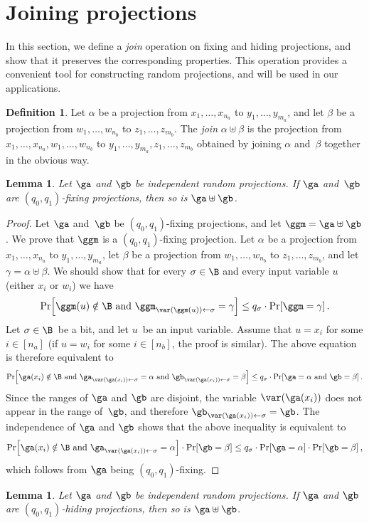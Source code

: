\documentclass[11pt]{article}
\numberwithin{equation}{section}
\newtheorem{lemma}[theorem]{Lemma}
\theoremstyle{definition}
\newtheorem{definition}[theorem]{Definition}
\theoremstyle{plain}
\theoremstyle{definition}\newtheorem{notation}[theorem]{Notation}\theoremstyle{plain}
\begin{document}
\section{\label{sec:join}Joining projections}

In this section, we define a \emph{join} operation on fixing and hiding
projections, and show that it preserves the corresponding properties.
This operation provides a convenient tool for constructing random
projections, and will be used in our applications.
\begin{definition}
Let $\alpha$ be a projection from $x_{1},\ldots,x_{n_{a}}$ to $y_{1},\ldots,y_{m_{a}}$,
and let $\beta$ be a projection from $w_{1},\ldots,w_{n_{b}}$ to
$z_{1},\ldots,z_{m_{b}}$. The \emph{join} $\alpha\uplus\beta$ is
the projection from $x_{1},\ldots,x_{n_{a}},w_{1},\ldots,w_{n_{b}}$
to $y_{1},\ldots,y_{m_{a}},z_{1},\ldots,z_{m_{b}}$ obtained by joining
$\alpha$ and~$\beta$ together in the obvious way. 
\end{definition}

\begin{lemma}
\label{lemma:concat-fixing}Let $\ga$ and $\gb$ be independent random
projections. If $\ga$ and~$\gb$ are $(q_{0},q_{1})$-fixing projections,
then so is $\ga\uplus\gb$. 
\end{lemma}

\begin{proof}
Let $\ga$ and~$\gb$ be $(q_{0},q_{1})$-fixing projections, and
let $\ggm=\ga\uplus\gb$. We prove that $\ggm$ is a $(q_{0},q_{1})$-fixing
projection. Let $\alpha$ be a projection from $x_{1},\ldots,x_{n_{a}}$
to $y_{1},\ldots,y_{m_{a}}$, let $\beta$ be a projection from $w_{1},\ldots,w_{n_{b}}$
to $z_{1},\ldots,z_{m_{b}}$, and let $\gamma=\alpha\uplus\beta$.
We should show that for every $\sigma\in\B$ and every input variable
$u$ (either $x_{i}$ or $w_{i}$) we have 
\[
\Pr\!\left[\ggm(u)\notin\B\text{ and }\ggm_{\var(\ggm(u))\gets\sigma}=\gamma\right]\leq q_{\sigma}\cdot\Pr\!\left[\ggm=\gamma\right].
\]
Let $\sigma\in\B$~be a bit, and let $u$~be an input variable.
Assume that $u=x_{i}$ for some $i\in\left[n_{a}\right]$ (if $u=w_{i}$
for some $i\in\left[n_{b}\right]$, the proof is similar). The above
equation is therefore equivalent to 
\[
\Pr\!\left[\ga(x_{i})\notin\B\text{ and }\ga_{\var(\ga(x_{i}))\gets\sigma}=\alpha\text{ and }\gb_{\var(\ga(x_{i}))\gets\sigma}=\beta\right]\leq q_{\sigma}\cdot\Pr\!\left[\ga=\alpha\text{ and }\gb=\beta\right].
\]
Since the ranges of $\ga$ and $\gb$ are disjoint, the variable $\var(\ga(x_{i}))$
does not appear in the range of~$\gb$, and therefore $\gb_{\var(\ga(x_{i}))\gets\sigma}=\gb$.
The independence of $\ga$ and $\gb$ shows that the above inequality
is equivalent to 
\[
\Pr\!\left[\ga(x_{i})\notin\B\text{ and }\ga_{\var(\ga(x_{i}))\gets\sigma}=\alpha\right]\cdot\Pr\!\left[\gb=\beta\right]\leq q_{\sigma}\cdot\Pr\!\left[\ga=\alpha\right]\cdot\Pr\!\left[\gb=\beta\right],
\]
which follows from $\ga$ being $(q_{0},q_{1})$-fixing. 
\end{proof}
\begin{lemma}
\label{lemma:concat-hiding}Let $\ga$ and $\gb$ be independent random
projections. If $\ga$ and $\gb$ are $(q_{0},q_{1})$-hiding projections,
then so is $\ga\uplus\gb$. 
\end{lemma}
\end{document}
